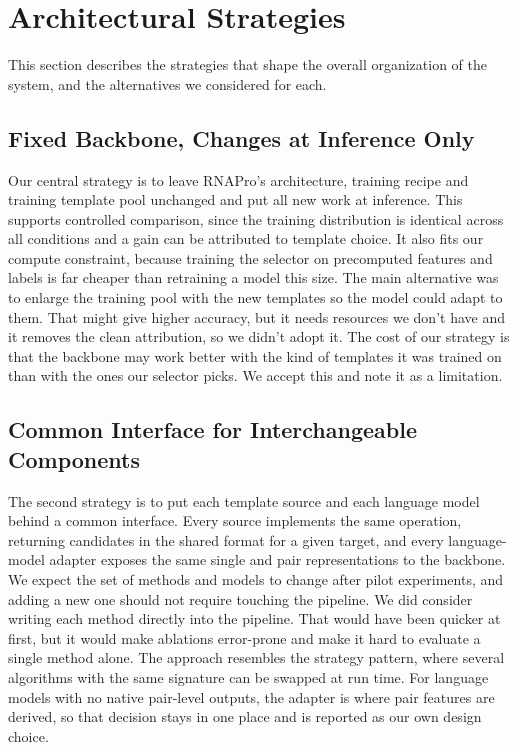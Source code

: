 \documentclass{FastFyp}
\begin{document}
\section{Architectural Strategies}
This section describes the strategies that shape the overall organization of the system, and the alternatives we considered for each.

\subsection{Fixed Backbone, Changes at Inference Only}
Our central strategy is to leave RNAPro's architecture, training recipe and training template pool unchanged and put all new work at inference. This supports controlled comparison, since the training distribution is identical across all conditions and a gain can be attributed to template choice. It also fits our compute constraint, because training the selector on precomputed features and labels is far cheaper than retraining a model this size. The main alternative was to enlarge the training pool with the new templates so the model could adapt to them. That might give higher accuracy, but it needs resources we don't have and it removes the clean attribution, so we didn't adopt it. The cost of our strategy is that the backbone may work better with the kind of templates it was trained on than with the ones our selector picks. We accept this and note it as a limitation.

\subsection{Common Interface for Interchangeable Components}
The second strategy is to put each template source and each language model behind a common interface. Every source implements the same operation, returning candidates in the shared format for a given target, and every language-model adapter exposes the same single and pair representations to the backbone. We expect the set of methods and models to change after pilot experiments, and adding a new one should not require touching the pipeline. We did consider writing each method directly into the pipeline. That would have been quicker at first, but it would make ablations error-prone and make it hard to evaluate a single method alone. The approach resembles the strategy pattern, where several algorithms with the same signature can be swapped at run time. For language models with no native pair-level outputs, the adapter is where pair features are derived, so that decision stays in one place and is reported as our own design choice.
\end{document}

